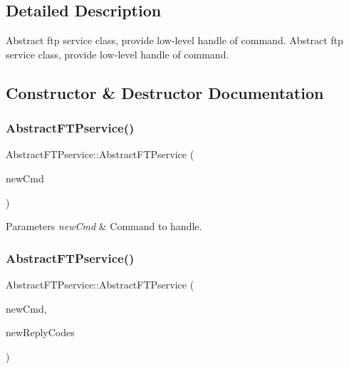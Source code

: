 \subsection{Detailed Description}
Abstract ftp service class, provide low-\/level handle of command.  Abstract ftp service class, provide low-\/level handle of command. 

\subsection{Constructor \& Destructor Documentation}
\mbox{\label{classAbstractFTPservice_acaddc197e13656887d4ee18f1119d755}} 
\subsubsection{\texorpdfstring{Abstract\+F\+T\+Pservice()}{AbstractFTPservice()}\hspace{0.1cm}{\footnotesize\ttfamily [1/2]}}
{\footnotesize\ttfamily Abstract\+F\+T\+Pservice\+::\+Abstract\+F\+T\+Pservice (\begin{DoxyParamCaption}\item[{\hyperlink{classAbstractFTPcommand}{Abstract\+F\+T\+Pcommand} $\ast$const}]{new\+Cmd }\end{DoxyParamCaption})\hspace{0.3cm}{\ttfamily [protected]}}


\begin{DoxyParams}{Parameters}
{\em new\+Cmd} & Command to handle. \\
\hline
\end{DoxyParams}
\mbox{\label{classAbstractFTPservice_ac420f6055d26efcd511d146a4e52155a}} 
\subsubsection{\texorpdfstring{Abstract\+F\+T\+Pservice()}{AbstractFTPservice()}\hspace{0.1cm}{\footnotesize\ttfamily [2/2]}}
{\footnotesize\ttfamily Abstract\+F\+T\+Pservice\+::\+Abstract\+F\+T\+Pservice (\begin{DoxyParamCaption}\item[{\hyperlink{classAbstractFTPcommand}{Abstract\+F\+T\+Pcommand} $\ast$const}]{new\+Cmd,  }\item[{Abstract\+F\+T\+Pservice\+::\+Exception\+Reply\+Code}]{new\+Reply\+Codes }\end{DoxyParamCaption})\hspace{0.3cm}{\ttfamily [protected]}}


